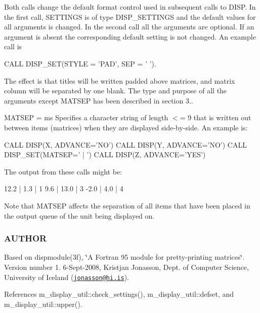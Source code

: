 Both calls change the default format control used in subsequent calls to D\+I\+SP. In the first call, S\+E\+T\+T\+I\+N\+GS is of type D\+I\+S\+P\+\_\+\+S\+E\+T\+T\+I\+N\+GS and the default values for all arguments is changed. In the second call all the arguments are optional. If an argument is absent the corresponding default setting is not changed. An example call is \begin{DoxyVerb}  CALL DISP_SET(STYLE = 'PAD', SEP = ' ').
\end{DoxyVerb}


The effect is that titles will be written padded above matrices, and matrix column will be separated by one blank. The type and purpose of all the arguments except M\+A\+T\+S\+EP has been described in section 3..

M\+A\+T\+S\+EP = ms Specifies a character string of length $<$= 9 that is written out between items (matrices) when they are displayed side-\/by-\/side. An example is\+: \begin{DoxyVerb} CALL DISP(X, ADVANCE='NO')
 CALL DISP(Y, ADVANCE='NO')
 CALL DISP_SET(MATSEP=' | ')
 CALL DISP(Z, ADVANCE='YES')
\end{DoxyVerb}


The output from these calls might be\+: \begin{DoxyVerb} 12.2 |  1.3 | 1
  9.6 | 13.0 | 3
 -2.0 |  4.0 | 4
\end{DoxyVerb}


Note that M\+A\+T\+S\+EP affects the separation of all items that have been placed in the output queue of the unit being displayed on. \subsubsection*{A\+U\+T\+H\+OR}

Based on dispmodule(3f), \char`\"{}\+A Fortran 95 module for pretty-\/printing matrices\char`\"{}. Version number 1. 6-\/\+Sept-\/2008, Kristjan Jonasson, Dept. of Computer Science, University of Iceland (\href{mailto:jonasson@hi.is}{\tt jonasson@hi.\+is}). 

References m\+\_\+display\+\_\+util\+::check\+\_\+settings(), m\+\_\+display\+\_\+util\+::defset, and m\+\_\+display\+\_\+util\+::upper().


